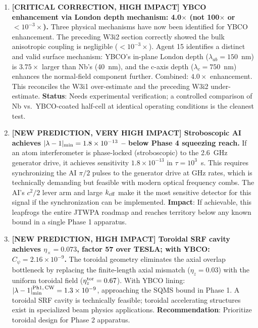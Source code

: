 \documentclass[11pt]{article}
\newcommand{\ee}[1]{\times 10^{#1}}
\begin{document}
\begin{enumerate}

\item \textbf{[CRITICAL CORRECTION, HIGH IMPACT] YBCO enhancement via London
depth mechanism: 4.0$\times$ (not 100$\times$ or $< 10^{-3}\times$).}
Three physical mechanisms have now been identified for YBCO enhancement.
The preceding W3i2 section correctly showed the bulk anisotropic coupling is
negligible ($< 10^{-3}\times$). Agent 15 identifies a distinct and valid
surface mechanism: YBCO's in-plane London depth ($\lambda_{ab} = 150$~nm)
is $3.75\times$ larger than Nb's (40~nm), and the c-axis depth ($\lambda_c = 750$~nm)
enhances the normal-field component further. Combined: $4.0\times$ enhancement.
This reconciles the W3i1 over-estimate and the preceding W3i2 under-estimate.
\textbf{Status}: Needs experimental verification; a controlled comparison of
Nb vs.\ YBCO-coated half-cell at identical operating conditions is the cleanest test.

\item \textbf{[NEW PREDICTION, VERY HIGH IMPACT] Stroboscopic AI achieves
$|\lambda-1|_{\rm min} = 1.8\ee{-13}$ -- below Phase 4 squeezing reach.}
If an atom interferometer is phase-locked (stroboscopic) to the 2.6~GHz
generator drive, it achieves sensitivity $1.8\ee{-13}$ in $\tau = 10^3$~s.
This requires synchronizing the AI $\pi/2$ pulses to the generator drive at
GHz rates, which is technically demanding but feasible with modern optical
frequency combs. The AI's $c^2/2$ lever arm and large $k_{\rm eff}$ make
it the most sensitive detector for this signal if the synchronization can
be implemented.
\textbf{Impact}: If achievable, this leapfrogs the entire JTWPA roadmap
and reaches territory below any known bound in a single Phase 1 apparatus.

\item \textbf{[NEW PREDICTION, HIGH IMPACT] Toroidal SRF cavity achieves
$\eta_\times = 0.073$, factor 57 over TESLA; with YBCO: $C_\psi = 2.16\ee{-9}$.}
The toroidal geometry eliminates the axial overlap bottleneck by replacing
the finite-length axial mismatch ($\eta_z = 0.03$) with the uniform toroidal
field ($\eta_z^{\rm tor} = 0.67$). With YBCO lining:
$|\lambda-1|_{\rm min}^{\rm Ph1,\,CW} = 1.3\ee{-9}$, approaching the
SQMS bound in Phase 1. A toroidal SRF cavity is technically feasible;
toroidal accelerating structures exist in specialized beam physics applications.
\textbf{Recommendation}: Prioritize toroidal design for Phase 2 apparatus.


\end{enumerate}
\end{document}
